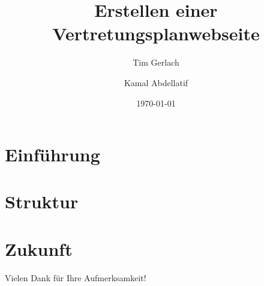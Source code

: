 \documentclass{beamer}
\title{Erstellen einer Vertretungsplanwebseite}
\author{Tim Gerlach \and Kamal Abdellatif}
\institute{Carl-Zeiss-Gymnasium Jena}
\date{\today}
\begin{document}
\begin{frame}[plain]
	\titlepage
\end{frame}


\section{Einführung}


\section{Struktur}


\section{Zukunft}




\begin{frame}\center\Huge Vielen Dank für Ihre Aufmerksamkeit!\end{frame}
\end{document}
